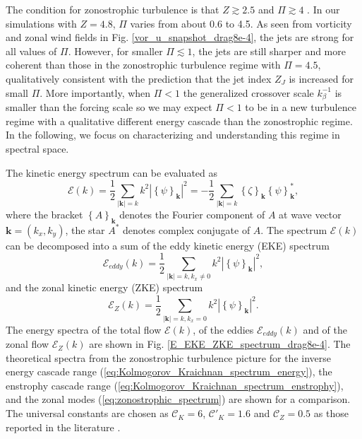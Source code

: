 \documentclass{jfm}
\begin{document}
The condition for zonostrophic turbulence is that $Z\apprge2.5$ and $\Pi\apprge4$
\citep{Sukoriansky2007,Galperin2010}. In our simulations with $Z=4.8$,
$\Pi$ varies from about 0.6 to 4.5. As seen from vorticity and zonal
wind fields in Fig. \ref{vor_u_snapshot_drag8e-4}, the jets are
strong for all values of $\Pi$. However, for smaller $\Pi\apprle 1$,
the jets are still sharper and more coherent than those in the zonostrophic turbulence
regime with $\Pi=4.5$, qualitatively consistent with the prediction
that the jet index $Z_{J}$ is increased for small $\Pi$. 
More importantly, when $\Pi<1$ the generalized crossover
scale $k_{\beta}^{-1}$ is smaller than the forcing scale so we may expect
$\Pi<1$ to be in a new turbulence regime with a qualitative different
energy cascade than the zonostrophic regime. In the following, we
focus on characterizing and understanding this regime in spectral space.

The kinetic energy spectrum can be evaluated as
\begin{equation}
\mathcal{E}(k)=\frac{1}{2}\underset{|\mathbf{k}|=k}{\sum}k^{2}|\left\{ \psi\right\} _{\mathbf{k}}|^{2}=-\frac{1}{2}\underset{|\mathbf{k}|=k}{\sum}\left\{ \zeta\right\} _{\mathbf{k}}\left\{ \psi\right\} _{\mathbf{k}}^{*},\label{eq:energy_spectrum_psi_zeta}
\end{equation}
where the bracket $\left\{ A\right\} _{\mathbf{k}}$ denotes the Fourier
component of $A$ at wave vector $\mathbf{k}=(k_{x},k_{y})$, the
star $A^{*}$ denotes complex conjugate of $A$. The spectrum $\mathcal{E}(k)$
can be decomposed into a sum of the eddy kinetic energy (EKE) spectrum
\begin{equation}
\mathcal{E}_{eddy}(k)=\frac{1}{2}\underset{|\mathbf{k}|=k,k_{x}\neq0}{\sum}k^{2}|\left\{ \psi\right\} _{\mathbf{k}}|^{2},\label{eq:EKE_spec_psi}
\end{equation}
and the zonal kinetic energy (ZKE) spectrum
\begin{equation}
\mathcal{E}_{Z}(k)=\frac{1}{2}\underset{|\mathbf{k}|=k,k_{x}=0}{\sum}k^{2}|\left\{ \psi\right\} _{\mathbf{k}}|^{2}.\label{eq:ZKE_spec_psi}
\end{equation}
The energy spectra of the total flow $\mathcal{E}(k)$, of the eddies
$\mathcal{E}_{eddy}(k)$ and of the zonal flow $\mathcal{E}_{Z}(k)$
are shown in Fig. \ref{E_EKE_ZKE_spectrum_drag8e-4}. The theoretical
spectra from the zonostrophic turbulence picture for the inverse energy 
cascade range (\ref{eq:Kolmogorov_Kraichnan_spectrum_energy}),
the enstrophy cascade range (\ref{eq:Kolmogorov_Kraichnan_spectrum_enstrophy}),
and the zonal modes (\ref{eq:zonostrophic_spectrum}) 
are shown for a comparison. The universal constants are chosen as
$\mathcal{C}_{K}=6$, $\mathcal{C'}_{K}=1.6$ and $\mathcal{C}_{Z}=0.5$
as those reported in the literature \citep{Boffetta2012,Galperin2010}.
\end{document}
